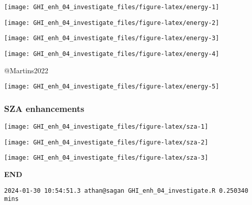 \documentclass[
  10pt,
  a4paper,oneside]{article}
\begin{document}
\begin{center}\texttt{[image: GHI\_enh\_04\_investigate\_files/figure-latex/energy-1]} \end{center}

\begin{center}\texttt{[image: GHI\_enh\_04\_investigate\_files/figure-latex/energy-2]} \end{center}

\begin{center}\texttt{[image: GHI\_enh\_04\_investigate\_files/figure-latex/energy-3]} \end{center}

\begin{center}\texttt{[image: GHI\_enh\_04\_investigate\_files/figure-latex/energy-4]} \end{center}

@Martins2022

\begin{center}\texttt{[image: GHI\_enh\_04\_investigate\_files/figure-latex/energy-5]} \end{center}

\newpage
\FloatBarrier

\hypertarget{sza-enhancements}{%
\subsubsection{SZA enhancements}\label{sza-enhancements}}

\begin{center}\texttt{[image: GHI\_enh\_04\_investigate\_files/figure-latex/sza-1]} \end{center}

\begin{center}\texttt{[image: GHI\_enh\_04\_investigate\_files/figure-latex/sza-2]} \end{center}

\begin{center}\texttt{[image: GHI\_enh\_04\_investigate\_files/figure-latex/sza-3]} \end{center}

\textbf{END}

\begin{verbatim}
2024-01-30 10:54:51.3 athan@sagan GHI_enh_04_investigate.R 0.250340 mins
\end{verbatim}
\end{document}
